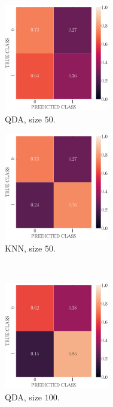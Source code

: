 \documentclass[12pt, a4 paper]{article}
\begin{document}
\begin{figure}[!htbp]
\centering
    \begin{subfigure}[!htbp]{0.24\textwidth}
       \centering
       \includegraphics[width=1.8in]{../results/ex2/conf_mtx_QD_ML_dataset_P2b_size_50.pdf}
       \caption{QDA, size $50$.}
       \label{fig:QDA_rr20_P2b_50}
    \end{subfigure}
\quad \quad
    \begin{subfigure}[!htbp]{0.24\textwidth}
       \centering
       \includegraphics[width=1.8in]{../results/ex2/conf_mtx_KNN_dataset_P2b_size_50.pdf}
       \caption{KNN, size $50$.}
       \label{fig:KNN_rr20_P2b_50}
    \end{subfigure}
\\  
    \begin{subfigure}[!htbp]{0.24\textwidth}
       \centering
       \includegraphics[width=1.8in]{../results/ex2/conf_mtx_QD_ML_dataset_P2b_size_100.pdf}
       \caption{QDA, size $100$.}
       \label{fig:QDA_rr20_P2b_100}
    \end{subfigure}
\quad \quad
    \begin{subfigure}[!htbp]{0.24\textwidth}

\end{subfigure}
\end{figure}
\end{document}
